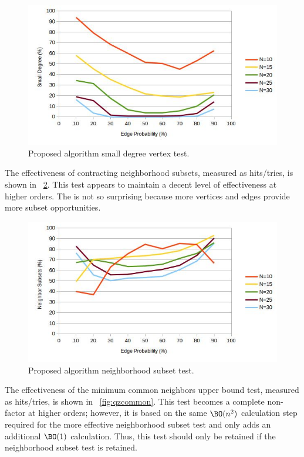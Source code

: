 \begin{figure}[H]
  \centering
  \includegraphics[width=5in]{qz_small}
  \caption{Proposed algorithm small degree vertex test.}
  \label{fig:qzsmall}
\end{figure}

The effectiveness of contracting neighborhood subsets, measured as hits/tries, is shown in
\figurename~\ref{fig:qzsubset}.  This test appears to maintain a decent level of effectiveness at higher orders.
The is not so surprising because more vertices and edges provide more subset opportunities.

\begin{figure}[H]
  \centering
  \includegraphics[width=5in]{qz_subset}
  \caption{Proposed algorithm neighborhood subset test.}
  \label{fig:qzsubset}
\end{figure}

The effectiveness of the minimum common neighbors upper bound test, measured as hits/tries, is shown in
\figurename~\ref{fig:qzcommon}.  This test becomes a complete non-factor at higher orders; however, it is based on
the same \(\BO(n^2)\) calculation step required for the more effective neighborhood subset test and only adds an
additional \(\BO(1)\) calculation.  Thus, this test should only be retained if the neighborhood subset test is
retained.

